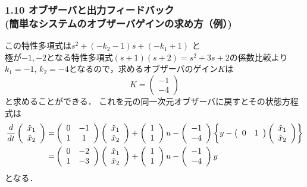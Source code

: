 \begin{frame}[t]
\frametitle{1.10 オブザーバと出力フィードバック \\
(簡単なシステムのオブザーバゲインの求め方（例）)}
この特性多項式は$s^2 + (-k_2 - 1)s + (-k_1 + 1)$ と\\
極が$-1, -2$となる特性多項式$(s+1)(s+2) = s^2 + 3s + 2$の係数比較より\\
$k_1 = -1$, $k_2 = -4$となるので，求めるオブザーバのゲイン$K$は
\[
 K =
 \left(
 \begin{array}{c}
  -1 \\
  -4
 \end{array}
 \right)
\]
と求めることができる．
これを元の同一次元オブザーバに戻すとその状態方程式は
{\small
\begin{align}
 \frac{d}{dt}
 \left(
 \begin{array}{c}
  \hat{x}_1 \\
  \hat{x}_2
 \end{array}
 \right)
 =&
 \left(
 \begin{array}{cc}
  0 & -1 \\
  1 & 1
 \end{array}
 \right)
 \left(
 \begin{array}{c}
  \hat{x}_1 \\
  \hat{x}_2
 \end{array}
 \right) +
 \left(
 \begin{array}{c}
  1 \\
  1
 \end{array}
 \right) u -
  \left(
 \begin{array}{c}
  -1 \\
  -4
 \end{array}
 \right)
\left\{y -
 \left(
 \begin{array}{cc}
  0 & 1
 \end{array}
 \right)
 \left(
 \begin{array}{c}
  \hat{x}_1 \\
  \hat{x}_2
 \end{array}
 \right)\right\} \notag \\
=&
 \left(
 \begin{array}{cc}
  0 & -2 \\
  1 & -3
 \end{array}
 \right)
 \left(
 \begin{array}{c}
  \hat{x}_1 \\
  \hat{x}_2
 \end{array}
 \right) +
 \left(
 \begin{array}{c}
  1 \\
  1
 \end{array}
 \right) u -
  \left(
 \begin{array}{c}
  -1 \\
  -4
 \end{array}
 \right)
y
\end{align}
}
となる．

\end{frame}


